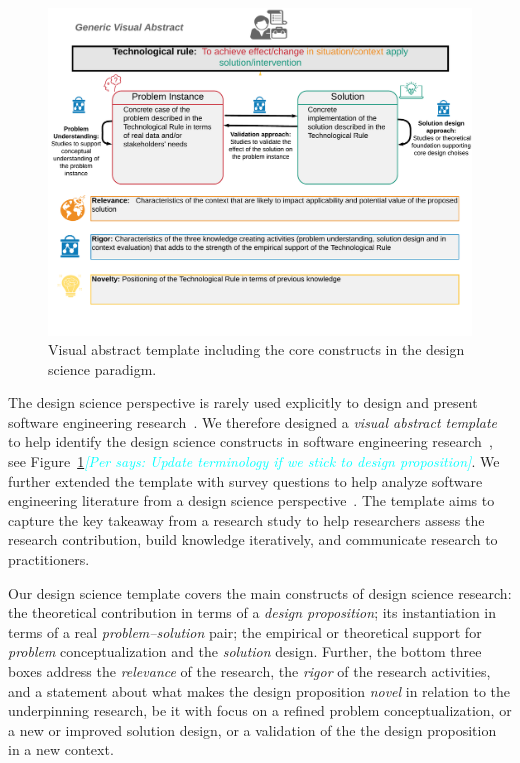 \documentclass[graybox]{svmult}
\newcommand{\per}[1]{\textcolor{cyan}{{\it [Per says: #1]}}}
\newcommand{\per}[1]{}
\begin{document}
\begin{figure}[t]
\includegraphics[width=1.0\textwidth, trim={0 15mm 0 0},clip]{Figures/GenericVA.png}
\caption{Visual abstract template including the core constructs in the design science paradigm.}
\label{fig:VA-template}      
\end{figure}


The design science perspective is rarely used explicitly to design and present software engineering research~\cite{Engstrom19arxiv}. We therefore designed a \emph{visual abstract template} to help identify the design science constructs in software engineering research~\cite{StoreyESEM17}, see Figure~\ref{fig:VA-template}\per{Update terminology if we stick to design proposition}. We further extended the template with survey questions to help analyze software engineering literature from a design science perspective~\cite{Engstrom19arxiv}. The template aims to capture the key takeaway from a research study to help researchers assess the research contribution, build knowledge iteratively, and communicate research to practitioners. %

Our design science template covers the main constructs of design science research: the theoretical contribution in terms of a \emph{design proposition}; its instantiation in terms of a real \emph{problem--solution} pair; the empirical or theoretical support for \emph{problem} conceptualization and the \emph{solution} design. Further, the bottom three boxes address the \emph{relevance} of the research, the \emph{rigor} of the research activities, and a statement about what makes the design proposition \emph{novel} in relation to the underpinning research, be it with focus on a refined problem conceptualization, or a new or improved solution design, or a validation of the the design proposition in a new context. 
\end{document}
